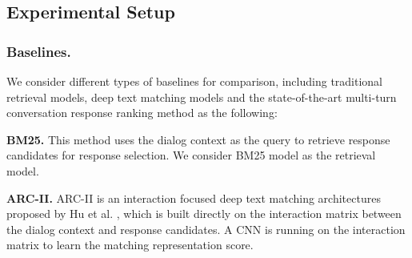 
\subsection{Experimental Setup}

\subsubsection{\textbf{Baselines.}}
We consider different types of baselines for comparison, including traditional retrieval models, deep text matching models and the state-of-the-art multi-turn conversation response ranking method as the following:

 \textbf{BM25.} This method uses the dialog context as the query to retrieve response candidates for response selection. We consider BM25 model \cite{Robertson:1994:SEA:188490.188561} as the retrieval model.

 \textbf{ARC-II.} ARC-II is an interaction focused deep text matching architectures proposed by Hu et al. \cite{DBLP:conf/nips/HuLLC14}, which is built directly on the interaction matrix between the dialog context and response candidates. A CNN is running on the interaction matrix to learn the matching representation score.

%
% 
 
